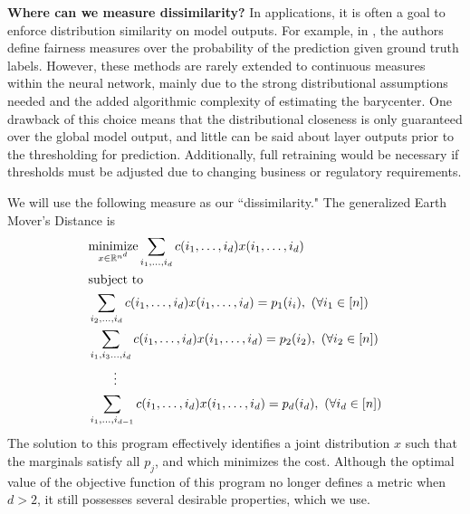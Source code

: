 \noindent\textbf{Where can we measure dissimilarity?}
In applications, it is often a goal to enforce distribution similarity on model outputs. For example, in \citep{jiang2020wasserstein}, the authors define fairness measures over the probability of the prediction given ground truth labels.   
% 
However, these methods are rarely extended to continuous measures within the neural network, 
mainly due to the strong distributional assumptions needed and the added algorithmic complexity of estimating the barycenter.
One drawback of this choice means that the distributional closeness is only guaranteed over the global model output, and little can be said about layer outputs prior to the thresholding for prediction.
Additionally, full retraining would be necessary if thresholds must be adjusted due to changing business or regulatory requirements.

We will use the following measure as our ``dissimilarity." The generalized Earth Mover's Distance is 
\begin{alignat}{2}\label{eqn:gemd}\begin{aligned}
&  \underset{x\in\mathbb{R}^{n^{d}}} {\textrm{minimize}}
\sum_{i_1,\ldots,i_d} c(i_1,\ldots, i_d)x(i_1,\ldots,i_d)\\
&\textrm{subject to}\\
&\sum_{i_2,\ldots,i_d} c(i_1,\ldots, i_d)x(i_1,\ldots,i_d) = p_1(i_i),\ (\forall i_1\in[n])\\
&\sum_{i_1,i_3\ldots,i_d} c(i_1,\ldots, i_d)x(i_1,\ldots,i_d) = p_2(i_2),\ (\forall i_2\in[n])\\
&\qquad\vdots\\
&\sum_{i_1,\ldots,i_{d-1}} c(i_1,\ldots, i_d)x(i_1,\ldots,i_d) = p_{d}(i_{d}),\ (\forall i_d\in[n])
\end{aligned}
\end{alignat}
The solution to this program effectively identifies a joint distribution $x$ such that the marginals satisfy all $p_j$, and which minimizes the cost. Although the optimal value of the objective function of this program no longer defines a metric when $d>2$, it still possesses several desirable properties, which we use. 

